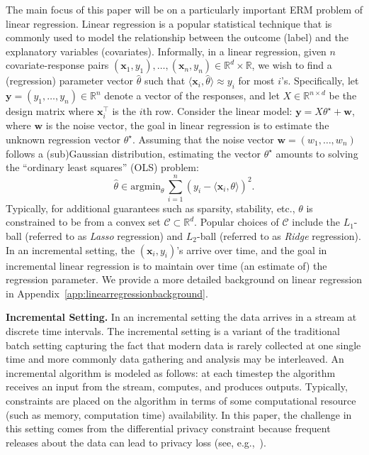\documentclass{article}
\theoremstyle{plain}
\def \y {\mathbf y}
\def \CCC {\mathcal{C}}
\def \x {\mathbf x}
\def \w {\mathbf w}
\def \R {\mathbb{R}}
\begin{document}
The main focus of this paper will be on a particularly important ERM problem of linear regression. Linear regression is a popular statistical technique that is commonly used to model the relationship between the outcome (label) and the explanatory variables (covariates). Informally, in a linear regression, given $n$ covariate-response pairs $(\x_1,y_1),\dots,(\x_n,y_n) \in \R^d \times \R$, we wish to find a (regression) parameter vector $\hat{\theta}$ such that $\langle \x_i, \hat{\theta} \rangle \approx y_i$ for most $i$'s. Specifically, let $\y = (y_1,\dots,y_n) \in \R^n$ denote a vector of the responses, and let $X \in \R^{n \times d}$ be the design matrix where $\x_i^\top$ is the $i$th row. Consider the linear model: $\y = X\theta^\star+ \w$, where $\w$ is the noise vector, the goal in linear regression is to estimate the unknown regression vector $\theta^\star$. Assuming that the noise vector $\w=(w_1,\dots,w_n)$ follows a (sub)Gaussian distribution, estimating the vector $\theta^\star$ amounts to solving the ``ordinary least squares'' (OLS) problem: $$\hat{\theta} \in \mbox{argmin}_\theta\, \sum_{i=1}^n (y_i - \langle \x_i,\theta \rangle)^2.$$ 
Typically, for additional guarantees such as sparsity, stability, etc., $\theta$ is constrained to be from a convex set $\CCC \subset \R^d$. Popular choices of $\CCC$ include the $L_1$-ball (referred to as {\em Lasso} regression) and $L_2$-ball (referred to as {\em Ridge} regression). In an incremental setting, the $(\x_i,y_i)$'s arrive over time, and the goal in incremental linear regression is to maintain over time (an estimate of) the regression parameter. We provide a more detailed background on linear regression in Appendix~\ref{app:linearregressionbackground}.

\noindent\textbf{Incremental Setting.} 
In an incremental setting the data arrives in a stream at discrete time intervals. The incremental setting is a variant of the traditional batch setting capturing the fact that modern data is rarely collected at one single time and more commonly data gathering and analysis may be interleaved. An incremental algorithm is modeled as follows: at each timestep the algorithm receives an input from the stream, computes, and produces outputs.  Typically, constraints are placed on the algorithm in terms of some computational resource (such as memory, computation time) availability. In this paper, the challenge in this setting comes from the differential privacy constraint because frequent releases about the data can lead to privacy loss (see, e.g.,~\cite{DiNi03,kasiviswanathan2013power}).
\end{document}

